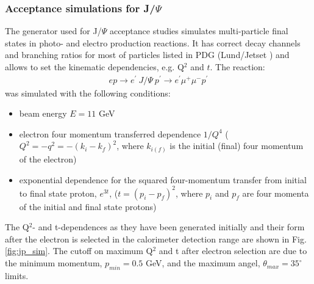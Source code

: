 \label{acc_simulations}
\indent


\clearpage

\subsubsection{Acceptance simulations for J/$\Psi$}
\indent

The generator used for J/$\Psi$ acceptance studies simulates multi-particle final states in photo- and electro production reactions. It has correct decay channels and branching ratios for most of particles listed in PDG (Lund/Jetset \cite{lepto}) and allows to set the kinematic dependencies, e.g. Q$^2$ and $t$. The reaction: 
\begin{eqnarray}
ep\to e^\prime~J/\Psi~p^\prime\to e^\prime\mu^+\mu^-p^\prime
\end{eqnarray}
was simulated with the following conditions:
\begin{itemize}
\item beam energy $E=11$ GeV
\item electron four momentum transferred dependence $1/{Q^4}$ ($Q^2=-q^2=-(k_i-k_f)^2$, where $k_{i(f)}$ is the initial (final) four momentum of the electron)
\item exponential dependence for the squared four-momentum transfer from initial to final state proton, $e^{3t}$, ($t=(p_i-p_f)^2$, where $p_i$ and $p_f$ are four momenta of the initial and final state protons)
\end{itemize}

The Q$^2$- and t-dependences as they have been generated initially and their form after the electron is selected in the calorimeter detection range are shown in Fig.\ref{fig:jp_sim}. The cutoff on maximum Q$^2$ and t after electron selection are due to the minimum momentum, $p_{min}=0.5$ GeV, and the maximum angel, $\theta_{max}=35^\circ$ limits.

